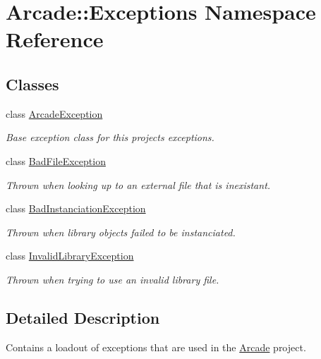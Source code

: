 \hypertarget{namespaceArcade_1_1Exceptions}{}\section{Arcade\+::Exceptions Namespace Reference}
\label{namespaceArcade_1_1Exceptions}
\subsection*{Classes}
\begin{DoxyCompactItemize}
\item 
class \mbox{\hyperlink{classArcade_1_1Exceptions_1_1ArcadeException}{Arcade\+Exception}}
\begin{DoxyCompactList}\small\item\em Base exception class for this projects\textquotesingle{} exceptions. \end{DoxyCompactList}\item 
class \mbox{\hyperlink{classArcade_1_1Exceptions_1_1BadFileException}{Bad\+File\+Exception}}
\begin{DoxyCompactList}\small\item\em Thrown when looking up to an external file that is inexistant. \end{DoxyCompactList}\item 
class \mbox{\hyperlink{classArcade_1_1Exceptions_1_1BadInstanciationException}{Bad\+Instanciation\+Exception}}
\begin{DoxyCompactList}\small\item\em Thrown when library objects failed to be instanciated. \end{DoxyCompactList}\item 
class \mbox{\hyperlink{classArcade_1_1Exceptions_1_1InvalidLibraryException}{Invalid\+Library\+Exception}}
\begin{DoxyCompactList}\small\item\em Thrown when trying to use an invalid library file. \end{DoxyCompactList}\end{DoxyCompactItemize}


\subsection{Detailed Description}
Contains a loadout of exceptions that are used in the \mbox{\hyperlink{namespaceArcade}{Arcade}} project. 